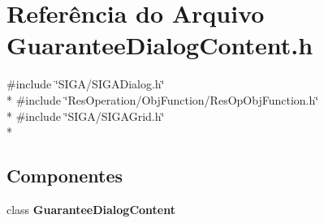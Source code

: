 \section{Referência do Arquivo Guarantee\+Dialog\+Content.\+h}
\label{_obj_function_2_guarantee_2_guarantee_dialog_content_8h}
{\ttfamily \#include \char`\"{}S\+I\+G\+A/\+S\+I\+G\+A\+Dialog.\+h\char`\"{}}\\*
{\ttfamily \#include \char`\"{}Res\+Operation/\+Obj\+Function/\+Res\+Op\+Obj\+Function.\+h\char`\"{}}\\*
{\ttfamily \#include \char`\"{}S\+I\+G\+A/\+S\+I\+G\+A\+Grid.\+h\char`\"{}}\\*
\subsection*{Componentes}
\begin{DoxyCompactItemize}
\item 
class {\bf Guarantee\+Dialog\+Content}
\end{DoxyCompactItemize}
